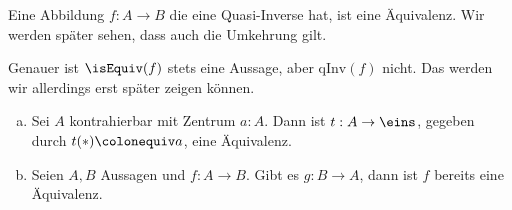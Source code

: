 \begin{bemerkung}
  Eine Abbildung $f:A\to B$ die eine Quasi-Inverse hat, ist eine Äquivalenz.
  Wir werden später sehen, dass auch die Umkehrung gilt.
\end{bemerkung}

Genauer ist $\isEquiv(f)$ stets eine Aussage, aber $\mathrm{qInv}(f)$ nicht.
Das werden wir allerdings erst später zeigen können.

\begin{beispiel}
  \begin{enumerate}[(a)]
  \item Sei $A$ kontrahierbar mit Zentrum $a:A$.
    Dann ist $t:A\to\eins$, gegeben durch $t(\ast)\colonequiv a$, eine Äquivalenz.
  \item Seien $A,B$ Aussagen und $f:A\to B$.
    Gibt es $g:B\to A$, dann ist $f$ bereits eine Äquivalenz.
  \end{enumerate}
\end{beispiel}
